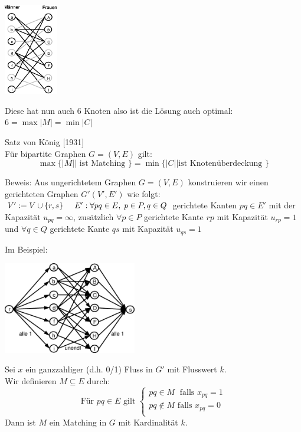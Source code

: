 \includegraphics[height=4cm]{bilder/3-0Heiraten3}

Diese hat nun auch 6 Knoten also ist die Lösung auch optimal:\\
$6=\max |M| = \min |C|$

\begin{satz}
Satz von König [1931]\\
Für bipartite Graphen $G=(V,E)$ gilt:\\
\[ \max \{ |M| | \mbox{ ist Matching } \} = \min \{ |C|| \mbox{
ist Knotenüberdeckung } \}\]
\end{satz}
Beweis: Aus ungerichtetem Graphen $G=(V,E)$ konstruieren wir einen
gerichteten Graphen $G'(V',E')$ wie folgt:\\
$ V':= V \cup \{r,s\} \hspace{5mm} E': \forall p q \in E,\; p \in P, q \in
Q$ gerichtete Kanten $p q \in E'$ mit der Kapazität $u_{p q} = \infty$,
zusätzlich $\forall p \in P$ gerichtete Kante $r p$ mit Kapazität $u_{r p}=1$
und $\forall q \in Q$ gerichtete Kante $q s$ mit Kapazität $u_{q s}= 1$

Im Beispiel:

\includegraphics[height=4cm]{bilder/3-0Heiraten4}

Sei $x$ ein ganzzahliger (d.h. 0/1) Fluss in $G'$ mit Flusswert $k$.\\
Wir definieren $M\subseteq E$ durch:
\[\mbox{Für $p q \in E$ gilt } \left\{ \begin{array}{l}
p q \in M \; \mbox{ falls } x_{p q}=1\\
p q \not \in M \mbox{ falls } x_{p q} = 0\\
\end{array} \right.\]
Dann ist $M$ ein Matching in $G$ mit Kardinalität $k$.

